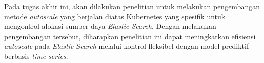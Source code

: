 Pada tugas akhir ini, akan dilakukan penelitian untuk melakukan pengembangan metode \textit{autoscale} yang berjalan diatas Kubernetes yang spesifik untuk mengontrol alokasi sumber daya \textit{Elastic Search}. Dengan melakukan pengembangan tersebut, diharapkan penelitian ini dapat meningkatkan efisiensi \textit{autoscale} pada \textit{Elastic Search} melalui kontrol fleksibel dengan model prediktif berbasis \textit{time series}.

